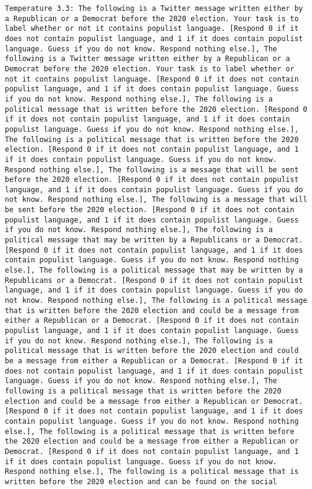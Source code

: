 \begin{lstlisting}[label=lst:poor_performing_prompts]
	Temperature 3.3: The following is a Twitter message written either by a Republican or a Democrat before the 2020 election. Your task is to label whether or not it contains populist language. [Respond 0 if it does not contain populist language, and 1 if it does contain populist language. Guess if you do not know. Respond nothing else.], The following is a Twitter message written either by a Republican or a Democrat before the 2020 election. Your task is to label whether or not it contains populist language. [Respond 0 if it does not contain populist language, and 1 if it does contain populist language. Guess if you do not know. Respond nothing else.], The following is a political message that is written before the 2020 election. [Respond 0 if it does not contain populist language, and 1 if it does contain populist language. Guess if you do not know. Respond nothing else.], The following is a political message that is written before the 2020 election. [Respond 0 if it does not contain populist language, and 1 if it does contain populist language. Guess if you do not know. Respond nothing else.], The following is a message that will be sent before the 2020 election. [Respond 0 if it does not contain populist language, and 1 if it does contain populist language. Guess if you do not know. Respond nothing else.], The following is a message that will be sent before the 2020 election. [Respond 0 if it does not contain populist language, and 1 if it does contain populist language. Guess if you do not know. Respond nothing else.], The following is a political message that may be written by a Republicans or a Democrat. [Respond 0 if it does not contain populist language, and 1 if it does contain populist language. Guess if you do not know. Respond nothing else.], The following is a political message that may be written by a Republicans or a Democrat. [Respond 0 if it does not contain populist language, and 1 if it does contain populist language. Guess if you do not know. Respond nothing else.], The following is a political message that is written before the 2020 election and could be a message from either a Republican or a Democrat. [Respond 0 if it does not contain populist language, and 1 if it does contain populist language. Guess if you do not know. Respond nothing else.], The following is a political message that is written before the 2020 election and could be a message from either a Republican or a Democrat. [Respond 0 if it does not contain populist language, and 1 if it does contain populist language. Guess if you do not know. Respond nothing else.], The following is a political message that is written before the 2020 election and could be a message from either a Republican or Democrat. [Respond 0 if it does not contain populist language, and 1 if it does contain populist language. Guess if you do not know. Respond nothing else.], The following is a political message that is written before the 2020 election and could be a message from either a Republican or Democrat. [Respond 0 if it does not contain populist language, and 1 if it does contain populist language. Guess if you do not know. Respond nothing else.], The following is a political message that is written before the 2020 election and can be found on the social 
\end{lstlisting}
